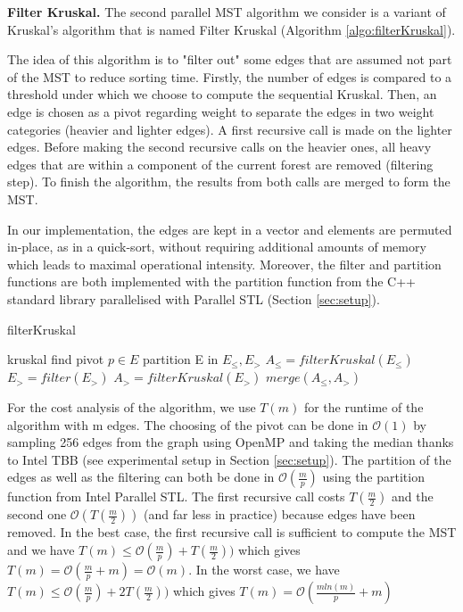 \documentclass[letterpaper]{article}
\newcommand{\mypar}[1]{{\bf #1.}}
\begin{document}
\mypar{Filter Kruskal} The second parallel MST algorithm we consider is a variant of Kruskal's algorithm that is named Filter Kruskal (Algorithm \ref{algo:filterKruskal}).

The idea of this algorithm is to "filter out" some edges that are assumed not part of the MST to reduce sorting time.
Firstly, the number of edges is compared to a threshold under which we choose to compute the sequential Kruskal.
Then, an edge is chosen as a pivot regarding weight to separate the edges in two weight categories (heavier and lighter edges).
A first recursive call is made on the lighter edges. Before making the second recursive calls on the heavier ones, all heavy edges that are within a component of the current forest are removed (filtering step).
To finish the algorithm, the results from both calls are merged to form the MST.

In our implementation, the edges are kept in a vector and elements are permuted in-place, as in a quick-sort, without requiring additional amounts of memory which leads to maximal operational intensity. Moreover, the filter and partition functions are both implemented with the partition function from the C++ standard library parallelised with Parallel STL (Section \ref{sec:setup}).

\begin{algorithm}
\caption{filterKruskal}
\label{algo:filterKruskal}
\begin{algorithmic}
    kruskal
\Else
    \State find pivot $p \in E$
    \State partition E in $E_{\leq}, E_{>}$
    \State $A_{\leq} = filterKruskal(E_{\leq})$
    \State $E_{>} = filter(E_{>})$
    \State $A_{>} = filterKruskal(E_{>})$
    \State \Return $merge(A_{\leq},  A_{>})$
\EndIf  
    
\end{algorithmic}
\end{algorithm}


For the cost analysis of the algorithm, we use $T(m)$ for the runtime of the algorithm with m edges. The choosing of the pivot can be done in $\mathcal{O}(1)$ by sampling 256 edges from the graph using OpenMP and taking the median thanks to Intel TBB (see experimental setup in Section \ref{sec:setup}).
The partition of the edges as well as the filtering can both be done in $\mathcal{O}(\frac{m}{p})$ using the partition function from Intel Parallel STL. The first recursive call costs $T(\frac{m}{2})$ and the second one $\mathcal{O}(T(\frac{m}{2}))$ (and far less in practice) because edges have been removed.
In the best case, the first recursive call is sufficient to compute the MST and we have $T(m) \leq  \mathcal{O}(\frac{m}{p}) + T(\frac{m}{2})) $ which gives $T(m) = \mathcal{O}(\frac{m}{p} + m) = \mathcal{O}(m)$.
In the worst case, we have $T(m) \leq  \mathcal{O}(\frac{m}{p}) + 2T(\frac{m}{2})) $ which gives $T(m) = \mathcal{O}(\frac{mln(m)}{p} + m)$
\end{document}
